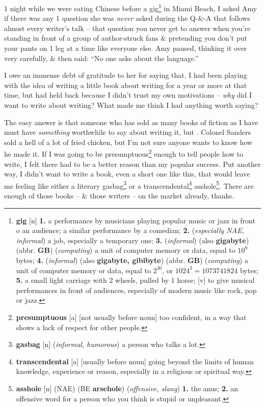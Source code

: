 \documentclass[oneside]{book}
\numberwithin{equation}{section}
\begin{document}
1 night while we were eating Chinese before a gig\footnote{\textbf{gig} [n] \textbf{1.} a performance by musicians playing popular music or jazz in front o an audience; a similar performance by a comedian; \textbf{2.} (\textit{especially NAE, informal}) a job, especially a temporary one; \textbf{3.} (\textit{informal}) (also \textbf{gigabyte}) (abbr. \textbf{GB}) (\textit{computing}) a unit of computer memory or data, equal to $10^9$ bytes; \textbf{4.} (\textit{informal}) (also \textbf{gigabyte, gibibyte}) (abbr. \textbf{GB}) (\textit{computing}) a unit of computer memory or data, equal to $2^{30}$, or $1024^3 = 1073741824$ bytes; \textbf{5.} a small light carriage with 2 wheels, pulled by 1 horse; [v] to give musical performances in front of audiences, especially of modern music like rock, pop or jazz.} in Miami Beach, I asked Amy if there was any 1 question she was \textit{never} asked during the Q-\&-A that follows almost every writer's talk -- that question you never get to answer when you're standing in front of a group of author-struck fans \& pretending you don't put your pants on 1 leg at a time like everyone else. Amy paused, thinking it over very carefully, \& then said: ``No one asks about the language.''

I owe an immense debt of gratitude to her for saying that. I had been playing with the idea of writing a little book about writing for a year or more at that time, but had held back because I didn't trust my own motivations -- \textit{why} did I want to write about writing? What made me think I had anything worth saying?

The easy answer is that someone who has sold as many books of fiction as I have must have \textit{something} worthwhile to say about writing it, but . Colonel Sanders sold a hell of a lot of fried chicken, but I'm not sure anyone wants to know how he made it. If I was going to be presumptuous\footnote{\textbf{presumptuous} [a] [not usually before noun] too confident, in a way that shows a lack of respect for other people.} enough to tell people how to write, I felt there had to be a better reason than my popular success. Put another way, I didn't want to write a book, even a short one like this, that would leave me feeling like either a literary gasbag\footnote{\textbf{gasbag} [n] (\textit{informal, humorous}) a person who talks a lot.} or a transcendental\footnote{\textbf{transcendental} [a] [usually before noun] going beyond the limits of human knowledge, experience or reason, especially in a religious or spiritual way.} asshole\footnote{\textbf{asshole} [n] (NAE) (BE \textbf{arsehole}) (\textit{offensive, slang}) \textbf{1.} the anus; \textbf{2.} an offensive word for a person who you think is stupid or unpleasant.}. There are enough of those books -- \& those writers -- on the market already, thanks.
\end{document}
